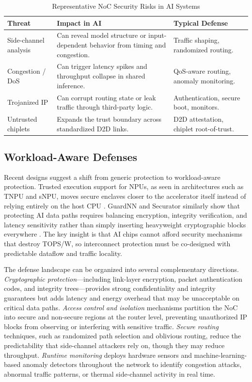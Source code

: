 \begin{table}[!t]
\caption{Representative NoC Security Risks in AI Systems}
\label{tab:security}
\centering
\footnotesize
\setlength{\tabcolsep}{3pt}
\renewcommand{\arraystretch}{1.08}
\begin{tabularx}{\columnwidth}{p{1.7cm}Y p{1.5cm}}
\toprule
Threat & Impact in AI & Typical Defense \\
\midrule
Side-channel analysis & Can reveal model structure or input-dependent behavior from timing and congestion. & Traffic shaping, randomized routing. \\
Congestion / DoS & Can trigger latency spikes and throughput collapse in shared inference. & QoS-aware routing, anomaly monitoring. \\
Trojanized IP & Can corrupt routing state or leak traffic through third-party logic. & Authentication, secure boot, monitors. \\
Untrusted chiplets & Expands the trust boundary across standardized D2D links. & D2D attestation, chiplet root-of-trust. \\
\bottomrule
\end{tabularx}
\end{table}

\subsection{Workload-Aware Defenses}

Recent designs suggest a shift from generic protection to workload-aware protection. Trusted execution support for NPUs, as seen in architectures such as TNPU and sNPU, moves secure enclaves closer to the accelerator itself instead of relying entirely on the host CPU \cite{lee2022tnpu,feng2024snpu}. GuardNN and Securator similarly show that protecting AI data paths requires balancing encryption, integrity verification, and latency sensitivity rather than simply inserting heavyweight cryptographic blocks everywhere \cite{hua2022guardnn,shrivastava2023securator}. The key insight is that AI chips cannot afford security mechanisms that destroy TOPS/W, so interconnect protection must be co-designed with predictable dataflow and traffic locality.

The defense landscape can be organized into several complementary directions. \emph{Cryptographic protection}---including link-layer encryption, packet authentication codes, and integrity trees---provides strong confidentiality and integrity guarantees but adds latency and energy overhead that may be unacceptable on critical data paths. \emph{Access control and isolation} mechanisms partition the NoC into secure and non-secure regions at the router level, preventing unauthorized IP blocks from observing or interfering with sensitive traffic. \emph{Secure routing} techniques, such as randomized path selection and oblivious routing, reduce the predictability that side-channel attackers rely on, though they may reduce throughput. \emph{Runtime monitoring} deploys hardware sensors and machine-learning-based anomaly detectors throughout the network to identify congestion attacks, abnormal traffic patterns, or thermal side-channel activity in real time.

